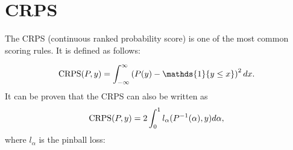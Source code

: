 \section{CRPS}
\label{ch:crps}

The CRPS (continuous ranked probability score) is one of the most common 
scoring rules. It is defined as follows: 

\[ \CRPS(P, y) = \int_{-\infty}^\infty \left( P(y) - \mathds{1} \{y \leq x\} \right)^2 dx. \]
It can be proven that the CRPS can also be written as 
\[ \operatorname{CRPS}(P, y) = 2 \int_0^1 l_\alpha(P^{-1}(\alpha), y) d\alpha, \]
where \(l_\alpha\) is the pinball loss: 
